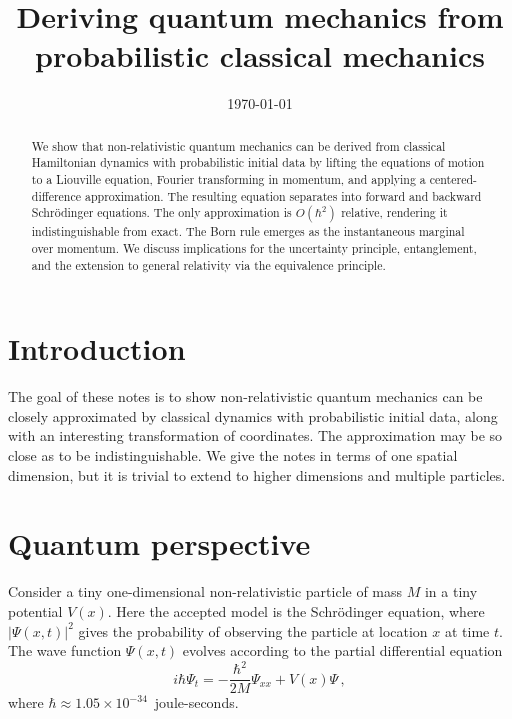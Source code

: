 \documentclass[prb,preprint]{revtex4-1}
\begin{document}
\title{Deriving quantum mechanics from probabilistic classical mechanics}


\date{\today}

\begin{abstract}
We show that non-relativistic quantum mechanics can be derived from classical
Hamiltonian dynamics with probabilistic initial data by lifting the equations of motion
to a Liouville equation, Fourier transforming in momentum, and applying a centered-difference
approximation.  The resulting equation separates into forward and backward
Schr\"odinger equations.  The only approximation is $O(\hbar^2)$ relative, rendering it
indistinguishable from exact.  The Born rule emerges as the instantaneous marginal
over momentum.  We discuss implications for the uncertainty principle, entanglement,
and the extension to general relativity via the equivalence principle.
\end{abstract}

\maketitle


\section{Introduction}

The goal of these notes is to show non-relativistic quantum mechanics can be closely
approximated by classical dynamics with probabilistic initial data, along with an interesting
transformation of coordinates.  The approximation may be so close as to be indistinguishable.
We give the notes in terms of one spatial dimension, but it is trivial to extend to higher
dimensions and multiple particles.


\section{Quantum perspective}

Consider a tiny one-dimensional non-relativistic particle of mass $M$ in a tiny potential $V(x)$.
Here the accepted model is the Schr\"odinger equation, where $|\Psi(x,t)|^2$ gives the probability
of observing the particle at location $x$ at time $t$.  The wave function $\Psi(x,t)$
evolves according to the partial differential equation
\begin{equation}\label{eq:schrodinger}
i\hbar \Psi_t = -\frac{\hbar^2}{2M}\Psi_{xx} + V(x)\Psi \,,
\end{equation}
where $\hbar \approx 1.05 \times 10^{-34}$~joule-seconds.
\end{document}

